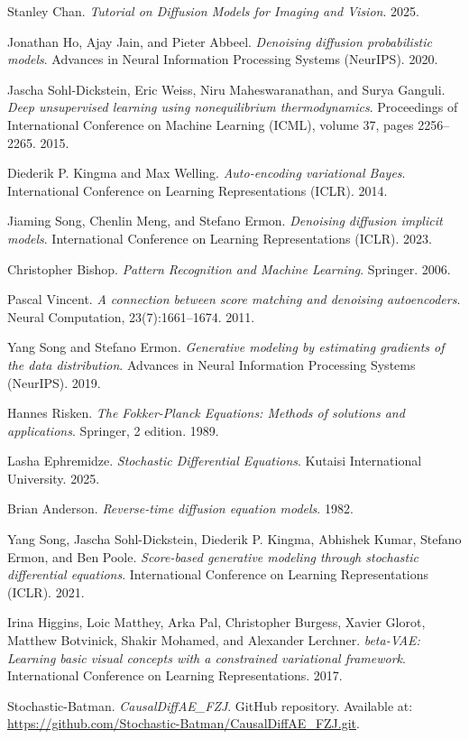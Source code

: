 \documentclass{article}
\begin{document}
\begin{thebibliography}{9}
	Stanley Chan.
	\textit{Tutorial on Diffusion Models for Imaging and Vision}.
	2025.
	
	Jonathan Ho, Ajay Jain, and Pieter Abbeel. 
	\textit{Denoising diffusion probabilistic models}. 
	Advances in Neural Information Processing Systems (NeurIPS). 
	2020.
	
	Jascha Sohl-Dickstein, Eric Weiss, Niru Maheswaranathan, and Surya Ganguli. 
	\textit{Deep unsupervised learning using nonequilibrium thermodynamics}.
	Proceedings of International Conference on Machine Learning (ICML), volume 37, pages 2256–2265.
	2015.
	
	Diederik P. Kingma and Max Welling. 
	\textit{Auto-encoding variational Bayes}. 
	International Conference on Learning Representations (ICLR).
	2014.
	
	Jiaming Song, Chenlin Meng, and Stefano Ermon. 
	\textit{Denoising diffusion implicit models}. 
	International Conference on Learning Representations (ICLR).
	2023.
	
	Christopher Bishop.
	\textit{Pattern Recognition and Machine Learning}.
	Springer. 
	2006.
	
	Pascal Vincent. 
	\textit{A connection between score matching and denoising autoencoders}.
	Neural Computation, 23(7):1661–1674.
	2011.
	
	Yang Song and Stefano Ermon. 
	\textit{Generative modeling by estimating gradients of the data distribution}.
	Advances in Neural Information Processing Systems (NeurIPS).
	2019.
	
	Hannes Risken. 
	\textit{The Fokker-Planck Equations: Methods of solutions and applications}.
	Springer, 2 edition. 
	1989.
	
	Lasha Ephremidze.
	\textit{Stochastic Differential Equations}.
	Kutaisi International University.
	2025.
	
	Brian Anderson. 
	\textit{Reverse-time diffusion equation models}.
	1982.
	
	Yang Song, Jascha Sohl-Dickstein, Diederik P. Kingma, Abhishek Kumar, Stefano Ermon, and Ben Poole. 
	\textit{Score-based generative modeling through stochastic differential equations}. 
	International Conference on Learning Representations (ICLR).
	2021.
	
	Irina Higgins, Loic Matthey, Arka Pal, Christopher Burgess, Xavier Glorot, Matthew Botvinick, Shakir Mohamed, and Alexander Lerchner. \textit{beta-VAE: Learning basic visual concepts with a constrained variational framework}. 
	International Conference on Learning Representations.
	2017.
	
	Stochastic-Batman. \textit{CausalDiffAE\_FZJ}. GitHub repository. Available at: \url{https://github.com/Stochastic-Batman/CausalDiffAE_FZJ.git}.
	
	\end{thebibliography}
\end{document}
